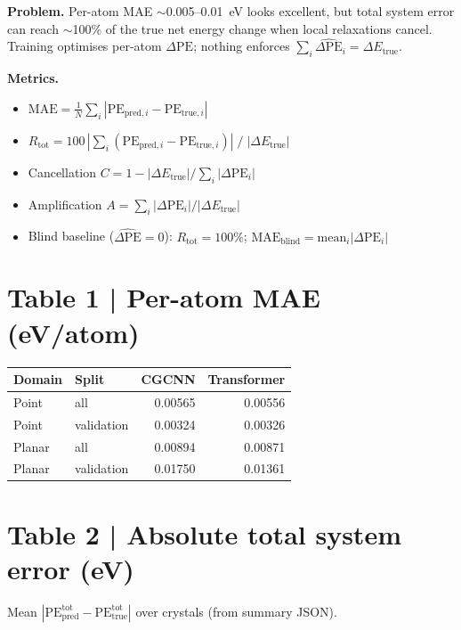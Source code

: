 \documentclass[11pt,a4paper]{article}
\begin{document}
\medskip
\noindent\textbf{Problem.} Per-atom MAE $\sim$0.005--0.01~eV looks excellent, but total system error can reach $\sim$100\% of the true net energy change when local relaxations cancel. Training optimises per-atom $\Delta\mathrm{PE}$; nothing enforces $\sum_i\widehat{\Delta\mathrm{PE}}_i=\Delta E_{\mathrm{true}}$.

\medskip
\noindent\textbf{Metrics.}
\begin{itemize}
  \item $\mathrm{MAE}=\frac{1}{N}\sum_i|\mathrm{PE}_{\mathrm{pred},i}-\mathrm{PE}_{\mathrm{true},i}|$
  \item $R_{\mathrm{tot}}=100\,|\sum_i(\mathrm{PE}_{\mathrm{pred},i}-\mathrm{PE}_{\mathrm{true},i})|\;/\;|\Delta E_{\mathrm{true}}|$
  \item Cancellation $C=1-|\Delta E_{\mathrm{true}}|/\sum_i|\Delta\mathrm{PE}_i|$
  \item Amplification $A=\sum_i|\Delta\mathrm{PE}_i|/|\Delta E_{\mathrm{true}}|$
  \item Blind baseline ($\widehat{\Delta\mathrm{PE}}=0$): $R_{\mathrm{tot}}=100\%$; $\mathrm{MAE}_{\mathrm{blind}}=\text{mean}_i|\Delta\mathrm{PE}_i|$
\end{itemize}

\section*{Table 1 | Per-atom MAE (eV/atom)}



\begin{center}
\small
\begin{tabular}{llrr}
  \toprule
  Domain & Split & CGCNN & Transformer \\
  \midrule
  Point  & all        & 0.00565 & 0.00556 \\
  Point  & validation & 0.00324 & 0.00326 \\
  Planar & all        & 0.00894 & 0.00871 \\
  Planar & validation & 0.01750 & 0.01361 \\
  \bottomrule
\end{tabular}
\end{center}

\section*{Table 2 | Absolute total system error (eV)}

Mean $|\mathrm{PE}_{\mathrm{pred}}^{\mathrm{tot}}-\mathrm{PE}_{\mathrm{true}}^{\mathrm{tot}}|$ over crystals (from summary JSON).
\end{document}
